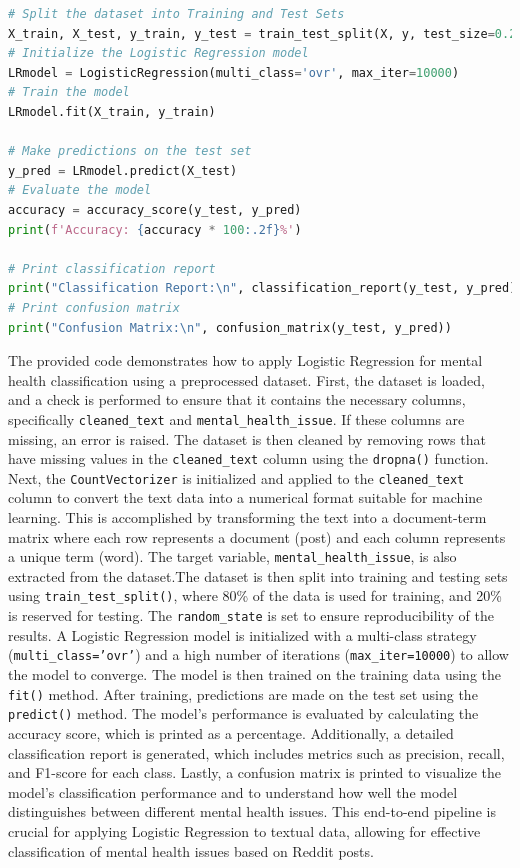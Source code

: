 \begin{tcolorbox}[colback=gray!5!white, colframe=gray!80!black, boxrule=0.5pt, title=Logistic Regression for Mental Health Classification]
    \begin{lstlisting}[language=Python]
# Split the dataset into Training and Test Sets
X_train, X_test, y_train, y_test = train_test_split(X, y, test_size=0.2, random_state=42)
# Initialize the Logistic Regression model
LRmodel = LogisticRegression(multi_class='ovr', max_iter=10000)
# Train the model
LRmodel.fit(X_train, y_train)

# Make predictions on the test set
y_pred = LRmodel.predict(X_test)
# Evaluate the model
accuracy = accuracy_score(y_test, y_pred)
print(f'Accuracy: {accuracy * 100:.2f}%')

# Print classification report
print("Classification Report:\n", classification_report(y_test, y_pred))
# Print confusion matrix
print("Confusion Matrix:\n", confusion_matrix(y_test, y_pred))
\end{lstlisting}
\end{tcolorbox}

\noindent
The provided code demonstrates how to apply Logistic Regression for mental health classification using a preprocessed dataset. First, the dataset is loaded, and a check is performed to ensure that it contains the necessary columns, specifically \texttt{cleaned\_text} and \texttt{mental\_health\_issue}. If these columns are missing, an error is raised. The dataset is then cleaned by removing rows that have missing values in the \texttt{cleaned\_text} column using the \texttt{dropna()} function. Next, the \texttt{CountVectorizer} is initialized and applied to the \texttt{cleaned\_text} column to convert the text data into a numerical format suitable for machine learning. This is accomplished by transforming the text into a document-term matrix where each row represents a document (post) and each column represents a unique term (word). The target variable, \texttt{mental\_health\_issue}, is also extracted from the dataset.The dataset is then split into training and testing sets using \texttt{train\_test\_split()}, where 80\% of the data is used for training, and 20\% is reserved for testing. The \texttt{random\_state} is set to ensure reproducibility of the results. A Logistic Regression model is initialized with a multi-class strategy (\texttt{multi\_class='ovr'}) and a high number of iterations (\texttt{max\_iter=10000}) to allow the model to converge. The model is then trained on the training data using the \texttt{fit()} method. After training, predictions are made on the test set using the \texttt{predict()} method. The model's performance is evaluated by calculating the accuracy score, which is printed as a percentage. Additionally, a detailed classification report is generated, which includes metrics such as precision, recall, and F1-score for each class. Lastly, a confusion matrix is printed to visualize the model's classification performance and to understand how well the model distinguishes between different mental health issues. This end-to-end pipeline is crucial for applying Logistic Regression to textual data, allowing for effective classification of mental health issues based on Reddit posts.

